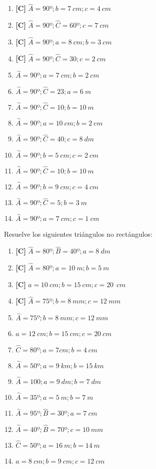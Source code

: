 \begin{enumerate}[topsep=0pt]
	\item \textbf{[C]} $\widehat{A} = 90º; b = 7~cm; c = 4~cm  $
	\item \textbf{[C]} $\widehat{A} = 90º; \widehat{C} = 60º; c = 7~cm  $
	\item \textbf{[C]} $\widehat{A} = 90º; a = 8~cm; b = 3~cm  $
	\item \textbf{[C]} $\widehat{A} = 90º; \widehat{C} = 30; c = 2~cm  $
	
	\item $\widehat{A} = 90º; a = 7~cm; b = 2~cm  $
	\item $\widehat{A} = 90º; \widehat{C} = 23; a = 6~m  $
	\item $\widehat{A} = 90º; \widehat{C} = 10; b = 10~m  $
	\item $\widehat{A} = 90º; a = 10~cm; b = 2~cm  $
	\item $\widehat{A} = 90º; \widehat{C} = 40; c = 8~dm  $
	\item $\widehat{A} = 90º; b = 5~cm; c = 2~cm  $
	\item $\widehat{A} = 90º; \widehat{C} = 10; b = 10~m  $
	\item $\widehat{A} = 90º; b = 9~cm; c = 4~cm  $
	\item $\widehat{A} = 90º; \widehat{C} = 5; b = 3~m  $
	\item $\widehat{A} = 90º; a = 7~cm; c = 1~cm  $

\end{enumerate}


\Exercicio Resuelve los siguientes triángulos no rectángulos:

\begin{enumerate}[topsep=0pt]
	\item \textbf{[C]} $\widehat{A} = 80º; \widehat{B} = 40º; a = 8~dm  $
	\item \textbf{[C]} $\widehat{A} = 80º;  a = 10~m; b = 5~m  $
	\item \textbf{[C]} $a = 10~cm; b = 15~cm; c = 20~~cm  $
	\item \textbf{[C]} $\widehat{A} = 75º; b = 8~mm; c = 12~mm  $

	\item $\widehat{A} = 75º; b = 8~mm; c = 12~mm  $
	\item $a=12~cm; b=15~cm; c = 20~cm $
	\item $\widehat{C}=80º; a=7cm; b=4~cm$
	\item $\widehat{A} = 50º; a=9~km; b=15~km$
	\item $\widehat{A} = 100; a=9~dm; b= 7~dm$
	\item $\widehat{A} = 35º; a=5~m; b=7~m$
	\item $\widehat{A} = 95º; \widehat{B} = 30º; a = 7~cm$
	\item $\widehat{A} = 40º; \widehat{B} = 70º; c = 10~mm$
	\item $\widehat{C} = 50º; a=16~m; b= 14~m$
	\item $a=8~cm; b=9~cm; c= 12~cm$
\end{enumerate}

